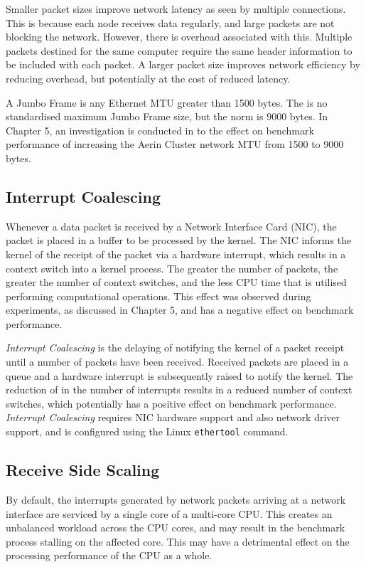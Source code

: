Smaller packet sizes improve network latency as seen by multiple connections. This is because each node receives data regularly, and large packets are not blocking the network. However, there is overhead associated with this. Multiple packets destined for the same computer require the same header information to be included with each packet. A larger packet size improves network efficiency by reducing overhead, but potentially at the cost of reduced latency.

A Jumbo Frame is any Ethernet MTU greater than 1500 bytes. The is no standardised maximum Jumbo Frame size, but the norm is 9000 bytes. In Chapter 5, an investigation is conducted in to the effect on benchmark performance of increasing the Aerin Cluster network MTU from 1500 to 9000 bytes.


\subsection{Interrupt Coalescing}

Whenever a data packet is received by a Network Interface Card (NIC), the packet is placed in a buffer to be processed by the kernel. The NIC informs the kernel of the receipt of the packet via a hardware interrupt, which results in a context switch into a kernel process. The greater the number of packets, the greater the number of context switches, and the less CPU time that is utilised performing computational operations. This effect was observed during experiments, as discussed in Chapter 5, and has a negative effect on benchmark performance.

\emph{Interrupt Coalescing} is the delaying of notifying the kernel of a packet receipt until a number of packets have been received. Received packets are placed in a queue and a hardware interrupt is subsequently raised to notify the kernel. The reduction of in the number of interrupts results in a reduced number of context switches, which potentially has a positive effect on benchmark performance. \emph{Interrupt Coalescing} requires NIC hardware support and also network driver support, and is configured using the Linux \verb|ethertool| command.


\subsection{Receive Side Scaling}

By default, the interrupts generated by network packets arriving at a network interface are serviced by a single core of a multi-core CPU. This creates an unbalanced workload across the CPU cores, and may result in the benchmark process stalling on the affected core. This may have a detrimental effect on the processing performance of the CPU as a whole.

